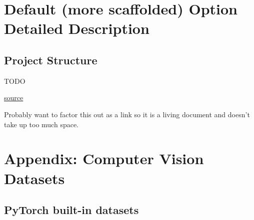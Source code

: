 \documentclass{tufte-handout}
\begin{document}
\section{Default (more scaffolded) Option Detailed Description}

\subsection*{Project Structure}
\bi
\item TODO
\ei

\href{https://www.notion.so/Entry-Level-Computer-Vision-Datasets-cc6fb53f51324779b29e26337642a649}{source}

Probably want to factor this out as a link so it is a living document and doesn't take up too much space.


\section*{Appendix: Computer Vision Datasets}
\subsection*{PyTorch built-in datasets}\label{pytorch-built-in-datasets}
\end{document}
